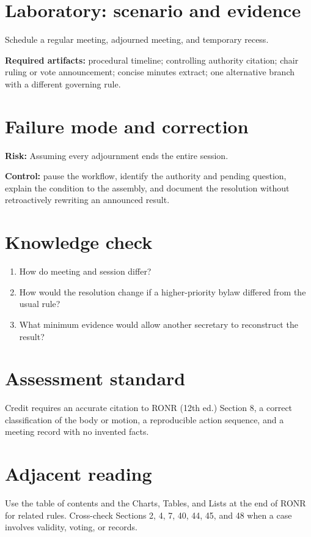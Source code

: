 \documentclass[11pt]{article}
\begin{document}
\section{Laboratory: scenario and evidence}
Schedule a regular meeting, adjourned meeting, and temporary recess.

\textbf{Required artifacts:} procedural timeline; controlling authority citation; chair ruling or vote announcement; concise minutes extract; one alternative branch with a different governing rule.

\section{Failure mode and correction}
\textbf{Risk:} Assuming every adjournment ends the entire session.

\textbf{Control:} pause the workflow, identify the authority and pending question, explain the condition to the assembly, and document the resolution without retroactively rewriting an announced result.

\section{Knowledge check}
\begin{enumerate}[leftmargin=*,itemsep=4pt]
\item How do meeting and session differ?
\item How would the resolution change if a higher-priority bylaw differed from the usual rule?
\item What minimum evidence would allow another secretary to reconstruct the result?
\end{enumerate}

\section{Assessment standard}
Credit requires an accurate citation to RONR (12th ed.) Section 8, a correct classification of the body or motion, a reproducible action sequence, and a meeting record with no invented facts.

\section{Adjacent reading}
Use the table of contents and the Charts, Tables, and Lists at the end of RONR for related rules. Cross-check Sections 2, 4, 7, 40, 44, 45, and 48 when a case involves validity, voting, or records.
\end{document}
